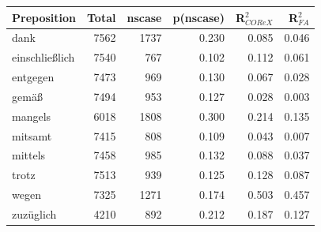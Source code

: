 \begin{table}
  \begin{tabular}{lrrrrr}
  \toprule
            Preposition  & Total  & nscase & p(nscase) & R$^2_{COReX}$ & R$^2_{FA}$ \\
  \midrule
            dank  & 7562   & 1737   & 0.230    & 0.085   & 0.046  \\
  einschließlich  & 7540   &  767   & 0.102    & 0.112   & 0.061 \\
        entgegen  & 7473   &  969   & 0.130    & 0.067   & 0.028 \\
           gemäß  & 7494   &  953   & 0.127    & 0.028   & 0.003 \\
         mangels  & 6018   & 1808   & 0.300    & 0.214   & 0.135 \\
         mitsamt  & 7415   &  808   & 0.109    & 0.043   & 0.007 \\
         mittels  & 7458   &  985   & 0.132    & 0.088   & 0.037 \\
           trotz  & 7513   &  939   & 0.125    & 0.128   & 0.087 \\
           wegen  & 7325   & 1271   & 0.174    & 0.503   & 0.457 \\
       zuzüglich  & 4210   &  892   & 0.212    & 0.187   & 0.127  \\
  \bottomrule
  \end{tabular}
\end{table}


